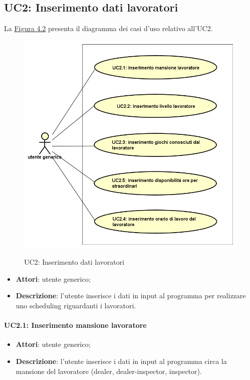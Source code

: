 \subsection{UC2: Inserimento dati lavoratori}
\label{UC2}
La \hyperref[fig42]{Figura 4.2} presenta il diagramma dei casi d'uso relativo all'UC2.
\begin{figure}[!h]
    \begin{widepage}
        \label{fig42}
    \includegraphics[width=14.9cm,keepaspectratio]{../immagini/usecase/UC2.png}
    \caption{UC2: Inserimento dati lavoratori}
    \end{widepage}
\end{figure}
\clearpage
\begin{itemize}
    \item \textbf{Attori}: utente generico;
    \item \textbf{Descrizione}: l'utente inserisce i dati in input al programma per realizzare uno scheduling riguardanti i lavoratori.
\end{itemize}
\paragraph{UC2.1: Inserimento mansione lavoratore}
\begin{itemize}
    \item \textbf{Attori}: utente generico;
    \item \textbf{Descrizione}: l'utente inserisce i dati in input al programma circa la mansione del lavoratore (dealer, dealer-inspector, inspector).
\end{itemize}
